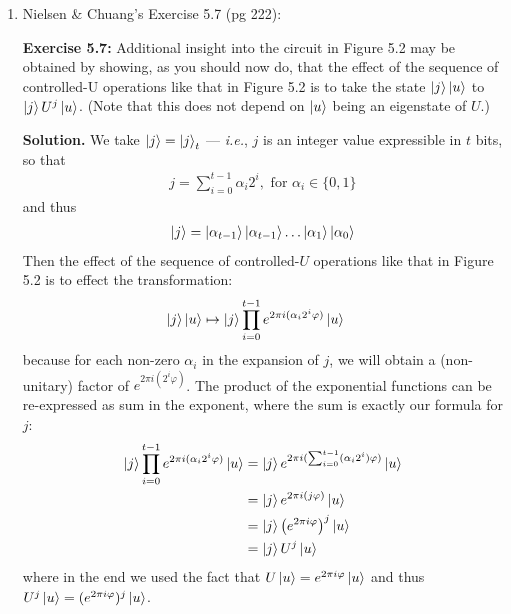 \documentclass{article}
\begin{document}
\begin{enumerate}[label=\textbf{(\arabic*)}]

\item Nielsen \& Chuang's Exercise 5.7 (pg 222):
\vspace{0.1in}
\begin{adjustwidth}{100pt}{100pt}
\begin{mdframed}[hidealllines=true, backgroundcolor=gray!20]
\textbf{Exercise 5.7:} Additional insight into the circuit in Figure 5.2 may be obtained by showing, as you should now do, that the effect of the sequence of controlled-U operations like that in Figure 5.2 is to take the state $\ket{j}\ket{u}$ to $\ket{j}U^{j}\ket{u}$. (Note that this does not depend on $\ket{u}$ being an eigenstate of $U$.)
\end{mdframed}
\end{adjustwidth}

\textbf{Solution.} We take $\ket{j} = \ket{j}_{t}$ --- \textit{i.e.}, $j$ is an integer value expressible in $t$ bits, so that
\begin{align}
    j = \sum_{i=0}^{t-1} \alpha_i 2^i, \text{ for } \alpha_i \in \{0, 1\}
\end{align}
and thus
\begin{align}
    \ket{j} = \ket{\alpha_{t-1}}\ket{\alpha_{t-1}}\ldots\ket{\alpha_{1}}\ket{\alpha_{0}}
\end{align}
Then the effect of the sequence of controlled-$U$ operations like that in Figure 5.2 is to effect the transformation:
\begin{align}
    \ket{j}\ket{u} 
    &\mapsto
    \ket{j}\prod_{i=0}^{t-1}{e^{2\pi i (\alpha_i 2^i \varphi)}}\ket{u}
\end{align}
because for each non-zero $\alpha_i$ in the expansion of $j$, we will obtain a (non-unitary) factor of $e^{2\pi i (2^i \varphi)}$. The product of the exponential functions can be re-expressed as sum in the exponent, where the sum is exactly our formula for $j$: 
\begin{align}
    \ket{j}\prod_{i=0}^{t-1}{e^{2\pi i (\alpha_i 2^i \varphi)}}\ket{u}
    &=
    \ket{j}{e^{2\pi i (\sum_{i=0}^{t-1}(\alpha_i 2^i) \varphi)}}\ket{u}\\
    &=
    \ket{j}{e^{2\pi i (j \varphi)}}\ket{u}\\
    &=
    \ket{j}{\left(e^{2\pi i \varphi}\right)^j}\ket{u}\\
    &=
    \ket{j}{U^j}\ket{u}\\
\end{align}
where in the end we used the fact that $U\ket{u} = e^{2\pi i \varphi}\ket{u}$ and thus $U^{j}\ket{u} = (e^{2\pi i \varphi})^j\ket{u}$.


\end{enumerate}
\end{document}

